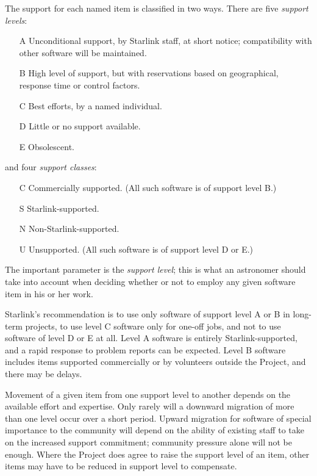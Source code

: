 \documentclass[nolof,11pt,noabs]{starlink}
\begin{document}
The support for each named item is classified in two ways.  There are
five \textit{support levels}:
\begin{enumerate}
\item[A] Unconditional support, by Starlink staff, at short
notice;  compatibility with other software will be maintained.
\item[B] High level of support, but with reservations based on
geographical, response time or control factors.
\item[C] Best efforts, by a named individual.
\item[D] Little or no support available.
\item[E] Obsolescent.
\end{enumerate}
and four \textit{support classes}:
\begin{enumerate}
\item[C] Commercially supported.  (All such software is of support level B.)
\item[S] Starlink-supported.
\item[N] Non-Starlink-supported.
\item[U] Unsupported.  (All such software is of support level D or E.)
\end{enumerate}
The important parameter is the \textit{support level};  this is what an
astronomer should take into account when deciding whether or not
to employ any given software item in his or her work.

Starlink's recommendation is to use only software of support level
A or B in long-term projects, to use level C software only for
one-off jobs, and not to use software of level D or E at all.
Level A software is entirely Starlink-supported, and a rapid
response to problem reports can be expected.  Level B software
includes items supported commercially or by volunteers outside
the Project, and there may be delays.

Movement of a given item from one support level to another depends
on the available effort and expertise.  Only rarely will
a downward migration of more than one level occur over a short
period.  Upward migration for software of special importance
to the community will depend on the ability of
existing staff to take on the increased support commitment;
community pressure alone will not be enough.  Where the
Project does agree to raise the support level of an item,
other items may have to be reduced in support level to compensate.
\end{document}
